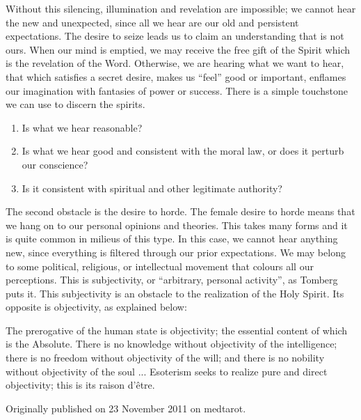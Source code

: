 Without this silencing, illumination and revelation are impossible; we cannot hear the new and unexpected, since all we hear are our old and persistent expectations. The desire to seize leads us to claim an understanding that is not ours. When our mind is emptied, we may receive the free gift of the Spirit which is the revelation of the Word. Otherwise, we are hearing what we want to hear, that which satisfies a secret desire, makes us ``feel'' good or important, enflames our imagination with fantasies of power or success. There is a simple touchstone we can use to discern the spirits.

\begin{enumerate}


\item Is what we hear reasonable?

\item Is what we hear good and consistent with the moral law, or does it perturb our conscience?

\item Is it consistent with spiritual and other legitimate authority?
\end{enumerate}


The second obstacle is the desire to horde. The female desire to horde means that we hang on to our personal opinions and theories. This takes many forms and it is quite common in milieus of this type. In this case, we cannot hear anything new, since everything is filtered through our prior expectations. We may belong to some political, religious, or intellectual movement that colours all our perceptions. This is subjectivity, or ``arbitrary, personal activity'', as Tomberg puts it. This subjectivity is an obstacle to the realization of the Holy Spirit. Its opposite is objectivity, as explained below:

\begin{quotex}
The prerogative of the human state is objectivity; the essential content of which is the Absolute. There is no knowledge without objectivity of the intelligence; there is no freedom without objectivity of the will; and there is no nobility without objectivity of the soul ... Esoterism seeks to realize pure and direct objectivity; this is its raison d'être.
\end{quotex}

Originally published on 23 November 2011 on medtarot.



